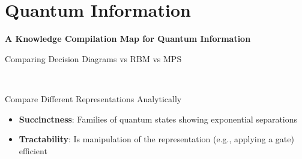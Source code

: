 \section{Quantum Information}


\begin{frame}
\begin{refsection}
	
\vfill

\vspace{-.5cm}\textbf{\Large A Knowledge Compilation Map for Quantum Information}~\cite{qkcm}\vspace{-.5cm}

\vfill

\printbibliography[section=\therefsection]
\end{refsection}

\end{frame}


\begin{frame}{Comparing Decision Diagrams vs RBM vs MPS}

\vspace{-.5em}
\centering

~

\pause

\begin{block}{Compare Different Representations Analytically}
	\begin{itemize}\vspace{-.5em}
		\item \textbf{Succinctness}: Families of quantum states showing exponential separations
		\item \textbf{Tractability}: Is manipulation of the representation (e.g., applying a gate) efficient
	\end{itemize}\vspace{-.5em}
\end{block}

\end{frame}




